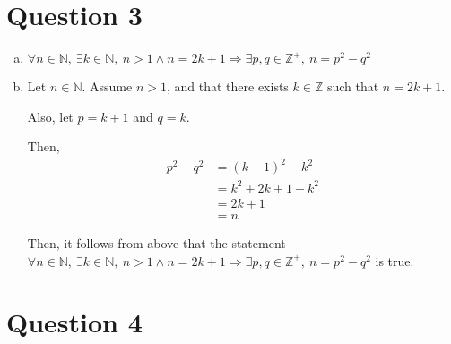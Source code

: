 \documentclass[12pt]{article}
\begin{document}
\section*{Question 3}
\begin{enumerate}[a.]
    \item

    $\forall n \in \mathbb{N},\:\exists k \in \mathbb{N},\:n > 1 \land n = 2k + 1 \Rightarrow
    \exists p,q \in \mathbb{Z}^{+},\:n = p^2 - q^2$

    \item

    Let $n \in \mathbb{N}$. Assume $n > 1$, and that there exists $k \in \mathbb{Z}$
    such that $n = 2k + 1$.

    \bigskip

    Also, let $p = k + 1$ and $q = k$.

    \bigskip

    Then,
    \setcounter{equation}{0}
    \begin{align}
        p^2 - q^2 &= (k+1)^2 - k^2\\
        &= k^2 + 2k + 1 - k^2\\
        &= 2k + 1\\
        &= n
    \end{align}

    Then, it follows from above that the statement  $\forall n \in \mathbb{N},\:
    \exists k \in \mathbb{N},\:n > 1 \land n = 2k + 1 \Rightarrow \exists p,q \in
    \mathbb{Z}^{+},\:n = p^2 - q^2$ is true.

\end{enumerate}


\section*{Question 4}
\end{document}
